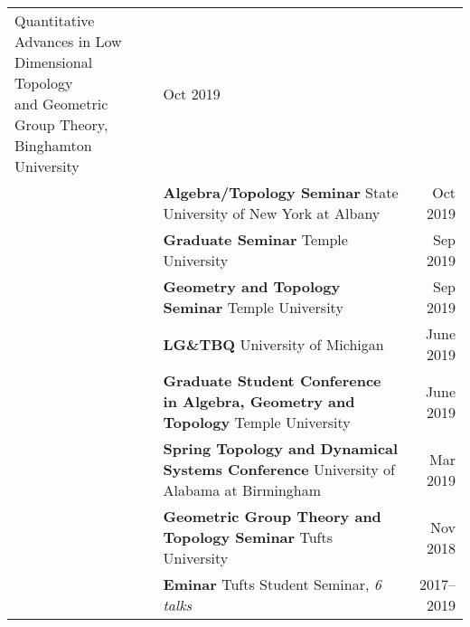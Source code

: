 \documentclass[10pt,letterpaper]{article}
\begin{document}
\begin{xltabular}{\textwidth}{HXr}
{	  Quantitative Advances in Low Dimensional Topology \newline\hspace*{2pc}
  and Geometric Group Theory,} Binghamton University
  & Oct 2019 \\
  & \textbf{Algebra/Topology Seminar}
  \newline\hspace*{2pc} State University
  of New York at Albany
  & Oct 2019 \\
  & \textbf{Graduate Seminar}
  \newline\hspace*{2pc} Temple University
  & Sep 2019 \\
  & \textbf{Geometry and Topology Seminar}
  \newline\hspace*{2pc} Temple University 
  & Sep 2019 \\
  & \textbf{LG\&TBQ} \newline\hspace*{2pc} University of Michigan 
  & June 2019 \\
  & \textbf{Graduate Student Conference in Algebra, Geometry and Topology}
  \newline\hspace*{2pc} Temple University
  & June 2019 \\
  & \textbf{Spring Topology and Dynamical Systems Conference}
  \newline\hspace*{2pc} University of Alabama at Birmingham
  & Mar 2019 \\
  & \textbf{Geometric Group Theory and Topology Seminar}
  \newline\hspace*{2pc} Tufts University
  & Nov 2018 \\
  & \textbf{Eminar} Tufts Student Seminar, \emph{6 talks}
  & 2017--2019
\end{xltabular}
\end{document}
